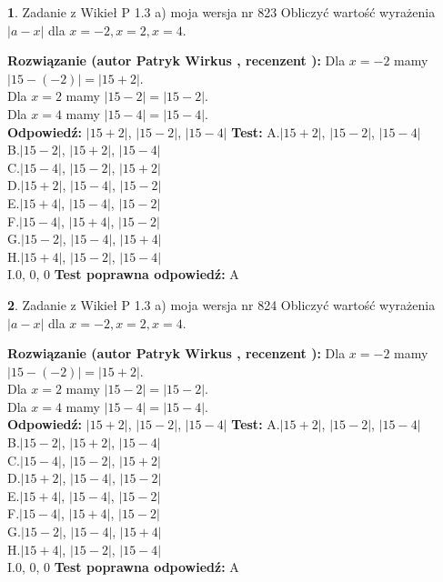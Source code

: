 \documentclass[12pt, a4paper]{article}
\theoremstyle{definition} %
\newtheorem{zad}{}
\newcommand{\zadStart}[1]{\begin{zad}#1\newline}
\newcommand{\zadStop}{\end{zad}}
\newcommand{\rozwStart}[2]{\noindent \textbf{Rozwiązanie (autor #1 , recenzent #2): }\newline}
\newcommand{\rozwStop}{\newline}
\newcommand{\odpStart}{\noindent \textbf{Odpowiedź:}\newline}
\newcommand{\odpStop}{\newline}
\newcommand{\testStart}{\noindent \textbf{Test:}\newline}
\newcommand{\testStop}{\newline}
\newcommand{\kluczStart}{\noindent \textbf{Test poprawna odpowiedź:}\newline}
\newcommand{\kluczStop}{\newline}
\begin{document}
\zadStart{Zadanie z Wikieł P 1.3 a) moja wersja nr 823}
Obliczyć wartość wyrażenia $|a - x|$ dla $x=-2,x=2,x=4$.
\zadStop
\rozwStart{Patryk Wirkus}{}
Dla $x = -2$ mamy $|15 - (-2)| = |15 + 2|$.\\
Dla $x = 2$ mamy $|15 - 2| = |15 - 2|$.\\
Dla $x = 4$ mamy $|15 - 4| = |15 - 4|$.\\
\rozwStop
\odpStart
$|15 + 2|$, $|15 - 2|$, $|15 - 4|$
\odpStop
\testStart
A.$|15 + 2|$, $|15 - 2|$, $|15 - 4|$\\
B.$|15 - 2|$, $|15 + 2|$, $|15 - 4|$\\
C.$|15 - 4|$, $|15 - 2|$, $|15 + 2|$\\
D.$|15 + 2|$, $|15 - 4|$, $|15 - 2|$\\
E.$|15 + 4|$, $|15 - 4|$, $|15 - 2|$\\
F.$|15 - 4|$, $|15 + 4|$, $|15 - 2|$\\
G.$|15 - 2|$, $|15 - 4|$, $|15 + 4|$\\
H.$|15 + 4|$, $|15 - 2|$, $|15 - 4|$\\
I.$0$, $0$, $0$
\testStop
\kluczStart
A
\kluczStop



\zadStart{Zadanie z Wikieł P 1.3 a) moja wersja nr 824}
Obliczyć wartość wyrażenia $|a - x|$ dla $x=-2,x=2,x=4$.
\zadStop
\rozwStart{Patryk Wirkus}{}
Dla $x = -2$ mamy $|15 - (-2)| = |15 + 2|$.\\
Dla $x = 2$ mamy $|15 - 2| = |15 - 2|$.\\
Dla $x = 4$ mamy $|15 - 4| = |15 - 4|$.\\
\rozwStop
\odpStart
$|15 + 2|$, $|15 - 2|$, $|15 - 4|$
\odpStop
\testStart
A.$|15 + 2|$, $|15 - 2|$, $|15 - 4|$\\
B.$|15 - 2|$, $|15 + 2|$, $|15 - 4|$\\
C.$|15 - 4|$, $|15 - 2|$, $|15 + 2|$\\
D.$|15 + 2|$, $|15 - 4|$, $|15 - 2|$\\
E.$|15 + 4|$, $|15 - 4|$, $|15 - 2|$\\
F.$|15 - 4|$, $|15 + 4|$, $|15 - 2|$\\
G.$|15 - 2|$, $|15 - 4|$, $|15 + 4|$\\
H.$|15 + 4|$, $|15 - 2|$, $|15 - 4|$\\
I.$0$, $0$, $0$
\testStop
\kluczStart
A
\kluczStop
\end{document}
